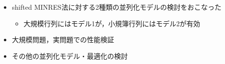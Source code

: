 

\begin{itemize}
	\item shifted MINRES法に対する2種類の並列化モデルの検討をおこなった
		\begin{itemize}
			\item 大規模行列にはモデル1が，小規簿行列にはモデル2が有効
		\end{itemize}
	\item 大規模問題，実問題での性能検証
	\item その他の並列化モデル・最適化の検討
\end{itemize}